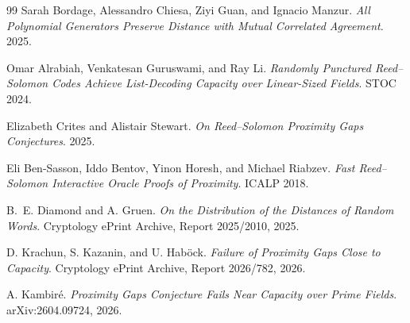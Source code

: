 \documentclass[11pt]{article}
\theoremstyle{definition}
\theoremstyle{remark}
\begin{document}
\begin{thebibliography}{99}
Sarah Bordage, Alessandro Chiesa, Ziyi Guan, and Ignacio Manzur.
\emph{All Polynomial Generators Preserve Distance with Mutual Correlated Agreement}. 2025.

Omar Alrabiah, Venkatesan Guruswami, and Ray Li.
\emph{Randomly Punctured Reed--Solomon Codes Achieve List-Decoding Capacity over Linear-Sized Fields}. STOC 2024.

Elizabeth Crites and Alistair Stewart.
\emph{On Reed--Solomon Proximity Gaps Conjectures}. 2025.

Eli Ben-Sasson, Iddo Bentov, Yinon Horesh, and Michael Riabzev.
\emph{Fast Reed--Solomon Interactive Oracle Proofs of Proximity}. ICALP 2018.

B.~E. Diamond and A. Gruen.
\emph{On the Distribution of the Distances of Random Words}. Cryptology ePrint Archive, Report 2025/2010, 2025.

D. Krachun, S. Kazanin, and U. Hab\"ock.
\emph{Failure of Proximity Gaps Close to Capacity}. Cryptology ePrint Archive, Report 2026/782, 2026.

A. Kambir\'e.
\emph{Proximity Gaps Conjecture Fails Near Capacity over Prime Fields}. arXiv:2604.09724, 2026.

\end{thebibliography}
\end{document}
